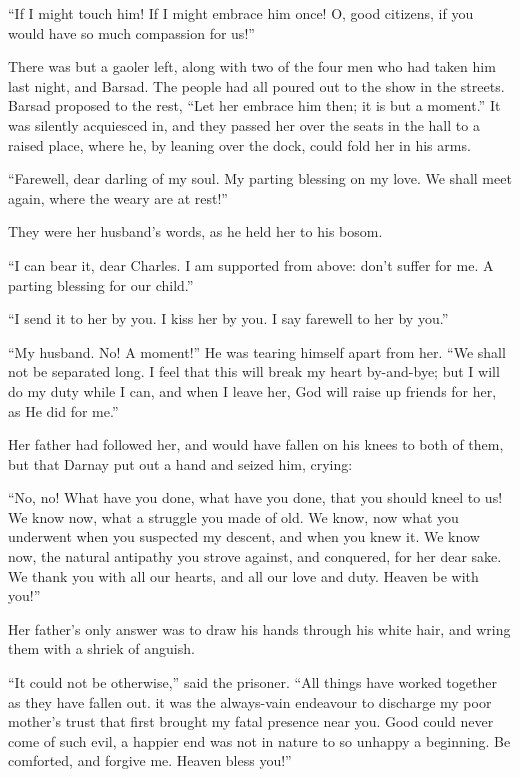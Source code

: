 ``If I might touch him!  If I might embrace him once!  O, good citizens,
if you would have so much compassion for us!''

There was but a gaoler left, along with two of the four men who had
taken him last night, and Barsad.  The people had all poured out to
the show in the streets.  Barsad proposed to the rest, ``Let her
embrace him then; it is but a moment.''  It was silently acquiesced in,
and they passed her over the seats in the hall to a raised place,
where he, by leaning over the dock, could fold her in his arms.

``Farewell, dear darling of my soul.  My parting blessing on my love.
We shall meet again, where the weary are at rest!''

They were her husband's words, as he held her to his bosom.

``I can bear it, dear Charles.  I am supported from above:  don't
suffer for me.  A parting blessing for our child.''

``I send it to her by you.  I kiss her by you.  I say farewell to her by you.''

``My husband.  No! A moment!''  He was tearing himself apart from her.
``We shall not be separated long.  I feel that this will break my heart
by-and-bye; but I will do my duty while I can, and when I leave her,
God will raise up friends for her, as He did for me.''

Her father had followed her, and would have fallen on his knees to
both of them, but that Darnay put out a hand and seized him, crying:

``No, no!  What have you done, what have you done, that you should
kneel to us!  We know now, what a struggle you made of old.  We know,
now what you underwent when you suspected my descent, and when you
knew it.  We know now, the natural antipathy you strove against, and
conquered, for her dear sake.  We thank you with all our hearts, and
all our love and duty.  Heaven be with you!''

Her father's only answer was to draw his hands through his white hair,
and wring them with a shriek of anguish.

``It could not be otherwise,'' said the prisoner.  ``All things have
worked together as they have fallen out. it was the always-vain
endeavour to discharge my poor mother's trust that first brought my
fatal presence near you.  Good could never come of such evil,
a happier end was not in nature to so unhappy a beginning.  Be comforted,
and forgive me.  Heaven bless you!''

